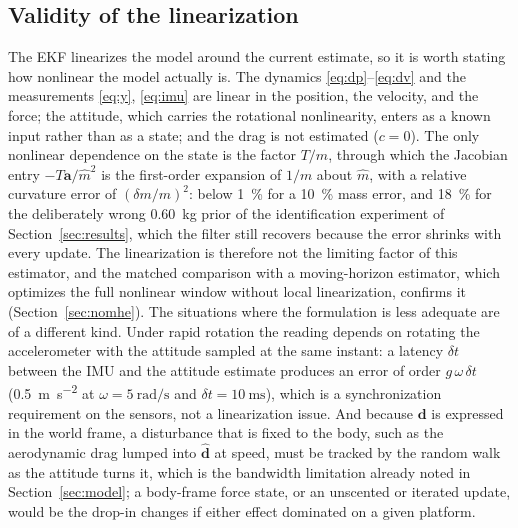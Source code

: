 \documentclass{ieeeaccess}
\newcommand{\vect}[1]{\bm{#1}}
\begin{document}
\subsection{Validity of the linearization}\label{sec:linear}
The EKF linearizes the model around the current estimate, so it is worth
stating how nonlinear the model actually is. The dynamics
\eqref{eq:dp}--\eqref{eq:dv} and the measurements \eqref{eq:y}, \eqref{eq:imu}
are linear in the position, the velocity, and the force; the attitude, which
carries the rotational nonlinearity, enters as a known input rather than as a
state; and the drag is not estimated ($c=0$). The only nonlinear dependence on
the state is the factor $T/m$, through which the Jacobian entry
$-T\vect{a}/\hat m^{2}$ is the first-order expansion of $1/m$ about $\hat m$,
with a relative curvature error of $(\delta m/m)^2$: below \SI{1}{\percent} for a
\SI{10}{\percent} mass error, and \SI{18}{\percent} for the deliberately wrong
\SI{0.60}{\kilogram} prior of the identification experiment of Section~\ref{sec:results}, which the filter still
recovers because the error shrinks with every update. The linearization is
therefore not the limiting factor of this estimator, and the matched comparison
with a moving-horizon estimator, which optimizes the full nonlinear window
without local linearization, confirms it (Section~\ref{sec:nomhe}). The
situations where the formulation is less adequate are of a different kind.
Under rapid rotation the reading depends on rotating the accelerometer with
the attitude sampled at the same instant: a latency $\delta t$ between the IMU
and the attitude estimate produces an error of order $g\,\omega\,\delta t$
(\SI{0.5}{\meter\per\square\second} at $\omega=\SI{5}{\radian\per\second}$ and
$\delta t=\SI{10}{\milli\second}$), which is a synchronization requirement on
the sensors, not a linearization issue. And because $\vect{d}$ is expressed in
the world frame, a disturbance that is fixed to the body, such as the
aerodynamic drag lumped into $\hat{\vect{d}}$ at speed, must be tracked by the
random walk as the attitude turns it, which is the bandwidth limitation already
noted in Section~\ref{sec:model}; a body-frame force state, or an unscented or
iterated update, would be the drop-in changes if either effect dominated on a
given platform.
\end{document}
